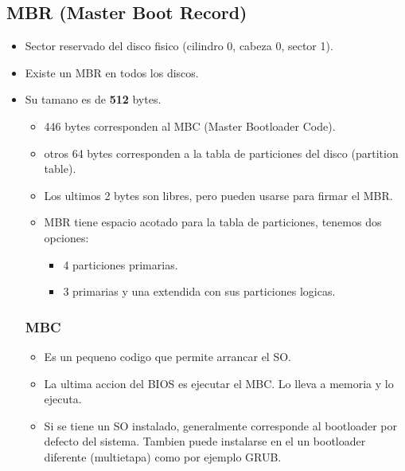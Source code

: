\documentclass[11pt]{article}
\begin{document}
\subsection{MBR (Master Boot Record)}
\begin{itemize}
    \item Sector reservado del disco fisico (cilindro 0, cabeza 0, sector 1).
    \item Existe un MBR en todos los discos.
    \item Su tamano es de \textbf{512} bytes.
        \begin{itemize}
            \item 446 bytes corresponden al MBC (Master Bootloader Code).
            \item otros 64 bytes corresponden a la tabla de particiones del disco (partition table).
            \item Los ultimos 2 bytes son libres, pero pueden usarse para firmar el MBR.
            \item MBR tiene espacio acotado para la tabla de particiones, tenemos dos opciones:
                \begin{itemize}
                    \item 4 particiones primarias.
                    \item 3 primarias y una extendida con sus particiones logicas.
                \end{itemize}
        \end{itemize}
        \subsubsection{MBC}
        \begin{itemize}
            \item Es un pequeno codigo que permite arrancar el SO.
            \item La ultima accion del BIOS es ejecutar el MBC. Lo lleva a memoria y lo ejecuta.
            \item Si se tiene un SO instalado, generalmente corresponde al bootloader por defecto del sistema. Tambien puede instalarse en el un bootloader diferente (multietapa) como por ejemplo GRUB.
        \end{itemize}


\end{itemize}
\end{document}
